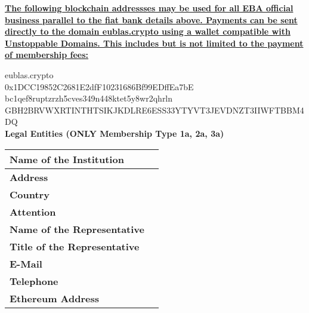 \documentclass{article}
\begin{document}
\begin{center}
  \uline{\bfseries The following blockchain addressses may be used for all EBA official business parallel to the fiat bank details above. Payments can be sent directly to the domain eublas.crypto using a wallet compatible with Unstoppable Domains. This includes but is not limited to the payment of membership fees:}\\
\end{center}

eublas.crypto\\

0x1DCC19852C2681E2dfF10231686Bf99EDffEa7bE\\

bc1qef8ruptzrzh5cves349n448ktet5y8wr2qhrln\\

GBH2BRVWXRTINTHTSIKJKDLRE6ESS33YTYVT3JEVDNZT3IIWFTBBM4DQ\\

\newpage
\textbf{Legal Entities (ONLY Membership Type 1a, 2a, 3a)}
\begin{longtable}{| p{} | p{} |}
	\hline
	\newline 
	\textbf{Name of the Institution} \newline & \\
	\hline	
	\newline 
	\textbf{Address} \newline & \\
	\hline	
	\newline 
	\textbf{Country} \newline & \\
	\hline	
	\newline 
	\textbf{Attention} \newline & \\
	\hline	
	\newline 
	\textbf{Name of the Representative} \newline & \\
	\hline	
	\newline 
	\textbf{Title of the Representative} \newline & \\
	\hline	
	\newline 
	\textbf{E-Mail} \newline & \\
	\hline	
	\newline 
	\textbf{Telephone} \newline & \\
	\hline	
	\newline 
	\textbf{Ethereum Address} \newline & \\
	\hline	
\end{longtable}
\vspace{1cm}
\end{document}
